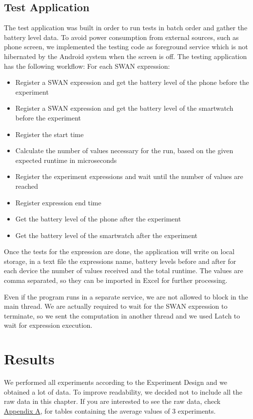 \subsection{Test Application}
The test application was built in order to run tests in batch order and gather the battery level data. To avoid power consumption from external sources, such as phone screen, we implemented the testing code as foreground service\cite{foreground_service} which is not hibernated by the Android system when the screen is off. 
The testing application has the following workflow:
For each SWAN expression:
\begin{itemize}
 \item Register a SWAN expression and get the battery level of the phone before the experiment
 \item Register a SWAN expression and get the battery level of the smartwatch before the experiment
 \item Register the start time
 \item Calculate the number of values necessary for the run, based on the given expected runtime in microseconds
 \item Register the experiment expressions and wait until the number of values are reached
 \item Register expression end time
 \item Get the battery level of the phone after the experiment
 \item Get the battery level of the smartwatch after the experiment
\end{itemize}


Once the tests for the expression are done, the application will write on local storage, in a text file the expressions name,
battery levels before and after for each device the number of values received and the total runtime.
 The values are comma separated, so they can be imported in Excel for further processing.

Even if the program runs in a separate service, we are not allowed to block in the main thread. 
We are actually required to wait for the SWAN expression to terminate, so we sent the computation in another thread and we used Latch to wait for expression execution.

 \section{Results}

We performed all experiments according to the Experiment Design and we obtained a lot of data. To improve readability,
we decided not to include all the raw data in this chapter. If you are interested to see the raw data, check \hyperref[AppendixPower]{Appendix A}, for tables containing the
average values of 3 experiments.

